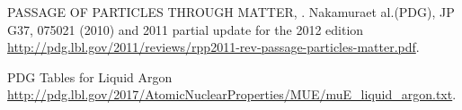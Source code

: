 \begin{thebibliography}{99}
\footnotesize

PASSAGE OF PARTICLES THROUGH MATTER, . Nakamuraet al.(PDG), JP G37, 075021 (2010) and 2011 partial update for the 2012 edition \url{http://pdg.lbl.gov/2011/reviews/rpp2011-rev-passage-particles-matter.pdf}.

PDG Tables for Liquid Argon \url{http://pdg.lbl.gov/2017/AtomicNuclearProperties/MUE/muE_liquid_argon.txt}. 



\end{thebibliography}
\textbf{}